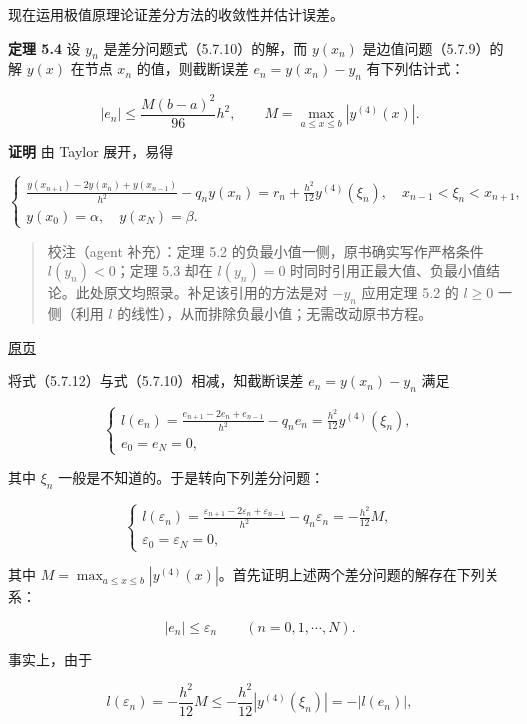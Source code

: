 \documentclass[
  10pt,
  fontset=fandol]{ctexart}
\begin{document}
现在运用极值原理论证差分方法的收敛性并估计误差。

\textbf{定理 5.4} 设 \(y_n\) 是差分问题式（5.7.10）的解，而 \(y(x_n)\) 是边值问题（5.7.9）的解 \(y(x)\) 在节点 \(x_n\) 的值，则截断误差 \(e_n=y(x_n)-y_n\) 有下列估计式：

\[
|e_n|\le\frac{M(b-a)^2}{96}h^2,\qquad
M=\max_{a\le x\le b}|y^{(4)}(x)|.
\tag{5.7.11}
\]

\textbf{证明} 由 Taylor 展开，易得

\[
\begin{cases}
\displaystyle\frac{y(x_{n+1})-2y(x_n)+y(x_{n-1})}{h^2}-q_ny(x_n)=r_n+\frac{h^2}{12}y^{(4)}(\xi_n),\quad x_{n-1}<\xi_n<x_{n+1},\\[6pt]
y(x_0)=\alpha,\quad y(x_N)=\beta.
\end{cases}
\tag{5.7.12}
\]

\begin{quote}
校注（agent 补充）：定理 5.2 的负最小值一侧，原书确实写作严格条件 \(l(y_n)<0\)；定理 5.3 却在 \(l(y_n)=0\) 时同时引用正最大值、负最小值结论。此处原文均照录。补足该引用的方法是对 \(-y_n\) 应用定理 5.2 的 \(l\ge0\) 一侧（利用 \(l\) 的线性），从而排除负最小值；无需改动原书方程。
\end{quote}

\href{../../source-images/pdf-152.jpeg}{原页}

将式（5.7.12）与式（5.7.10）相减，知截断误差 \(e_n=y(x_n)-y_n\) 满足

\[
\begin{cases}
\displaystyle l(e_n)=\frac{e_{n+1}-2e_n+e_{n-1}}{h^2}-q_ne_n=\frac{h^2}{12}y^{(4)}(\xi_n),\\[6pt]
e_0=e_N=0,
\end{cases}
\]

其中 \(\xi_n\) 一般是不知道的。于是转向下列差分问题：

\[
\begin{cases}
\displaystyle l(\varepsilon_n)=\frac{\varepsilon_{n+1}-2\varepsilon_n+\varepsilon_{n-1}}{h^2}-q_n\varepsilon_n=-\frac{h^2}{12}M,\\[6pt]
\varepsilon_0=\varepsilon_N=0,
\end{cases}
\tag{5.7.13}
\]

其中 \(M=\max_{a\le x\le b}|y^{(4)}(x)|\)。首先证明上述两个差分问题的解存在下列关系：

\[
|e_n|\le\varepsilon_n\qquad(n=0,1,\cdots,N).
\tag{5.7.14}
\]

事实上，由于

\[
l(\varepsilon_n)=-\frac{h^2}{12}M\le-\frac{h^2}{12}|y^{(4)}(\xi_n)|=-|l(e_n)|,
\]
\end{document}
